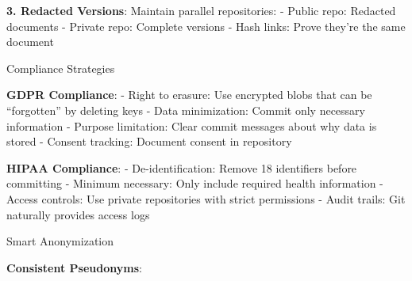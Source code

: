 \textbf{3. Redacted Versions}: Maintain parallel repositories: - Public
repo: Redacted documents - Private repo: Complete versions - Hash links:
Prove they're the same document

\begin{Shaded}
\begin{Highlighting}[]
 

 
 
\end{Highlighting}
\end{Shaded}

Compliance Strategies

\textbf{GDPR Compliance}: - Right to erasure: Use encrypted blobs that
can be ``forgotten'' by deleting keys - Data minimization: Commit only
necessary information - Purpose limitation: Clear commit messages about
why data is stored - Consent tracking: Document consent in repository

\textbf{HIPAA Compliance}: - De-identification: Remove 18 identifiers
before committing - Minimum necessary: Only include required health
information - Access controls: Use private repositories with strict
permissions - Audit trails: Git naturally provides access logs

Smart Anonymization

\textbf{Consistent Pseudonyms}:

\begin{Shaded}
\begin{Highlighting}[]

     \OperatorTok{=}\SpecialCharTok{\{}\SpecialCharTok{\}\{}\SpecialCharTok{\}}
     \SpecialCharTok{\{}\NormalTok{[:}\NormalTok{]}\SpecialCharTok{\}}

\end{Highlighting}
\end{Shaded}


